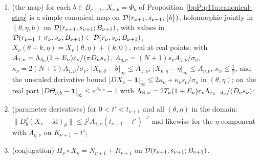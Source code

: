 \begin{proposition}
\begin{enumerate}[label=(O\arabic*),ref=(O\arabic*)]
\item\label{bpP:p11a:O3} (the map) for each $b\in B_{\nu+1}$, $X_{\nu,b}=\Phi_b$ of Proposition~\ref{bpP:p11a:canonical-step} is a simple canonical map on $\mathcal D(r_{\nu+1},s_{\nu+1};\{b\})$, holomorphic jointly in $(\theta,\eta,b)$ on $\mathcal D(r_{\nu+1},s_{\nu+1};B_{\nu+1})$, with values in $\mathcal D(r_{\nu+1}+\sigma_\nu,s_\nu;B_{\nu+1})\subset\mathcal D(r_\nu,s_\nu;B_{\nu+1})$, $X_\nu(\theta+k,\eta)=X_\nu(\theta,\eta)+(k,0)$, real at real points; with $A_{1,\nu}=\Lambda_{\delta_\nu}(1+E_\nu)\varepsilon_\nu/(\pi D_\nu s_\nu)$, $A_{\eta,\nu}=(N+1)s_\nu A_{1,\nu}/\sigma_\nu$, $\kappa_\nu=2(N+1)A_{1,\nu}/\sigma_\nu$:
$\lvert X_{\nu,\theta}-\theta\rvert_\infty\le A_{1,\nu}$, $\lvert X_{\nu,\eta}-\eta\rvert_\infty\le A_{\eta,\nu}$, $\kappa_\nu\le\frac12$, and the unscaled derivative bound $\lvert DX_\nu-\mathbf 1\rvert_\infty\le2\kappa_\nu+\kappa_\nu s_\nu/\sigma_\nu$ in $(\theta,\eta)$; on the real part $\lvert D\Theta_{\nu,b}-\mathbf 1\rvert_\infty\le e^{\Lambda_{\mathbb R,\nu}}-1$ with $\Lambda_{\mathbb R,\nu}=2T_\nu(1+E_\nu)\varepsilon_\nu\Lambda_{r_\nu-d_\nu}/(D_\nu s_\nu)$;
\item\label{bpP:p11a:O4} (parameter derivatives) for $0<t'<t_{\nu+1}$ and all $(\theta,\eta)$ in the domain: $\lVert D_b^j(X_\nu-\mathrm{id})_\theta\rVert\le j^jA_{1,\nu}(t_{\nu+1}-t')^{-j}$ and likewise for the $\eta$-component with $A_{\eta,\nu}$ on $K_{\nu+1}+t'$;
\item\label{bpP:p11a:O5} (conjugation) $H_\nu\circ X_\nu=N_{\nu+1}+R_{\nu+1}$ on $\mathcal D(r_{\nu+1},s_{\nu+1};B_{\nu+1})$.
\end{enumerate}
\end{proposition}
